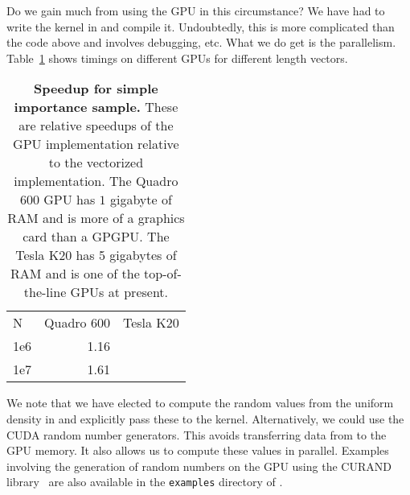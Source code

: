 Do we gain much from using the GPU in this circumstance?
We have had to write the kernel in \C{} and compile it.
Undoubtedly, this is more complicated than the \R{} code above
and involves debugging, etc.
What we do get is the parallelism. 
Table~\ref{tab:ImportanceSamplingTimings} shows timings
on different GPUs for different length vectors.
\begin{table}
\begin{tabular}{lrr}
 N  & Quadro 600 & Tesla K20 \\
1e6 &  1.16  &  \\
1e7 &  1.61  &  \\
\end{tabular}
\caption{\textbf{Speedup for simple importance sample.}
These are relative speedups of the GPU implementation relative
to the vectorized \R{} implementation.
The Quadro 600 GPU has $1$ gigabyte of RAM and is more of a
graphics card than a GPGPU.
The Tesla K20 has 5 gigabytes of RAM and is one of the top-of-the-line
GPUs at present.
}\label{tab:ImportanceSamplingTimings} 
\end{table}
\begin{comment}
ids = lapply(list.files(pattern = "rda$"), load, globalenv())
times = structure(lapply(unlist(ids), function(id) get(id)[3,]), names = unlist(ids))
tm = cbind(data.frame(times = sapply(times, median)), as.data.frame(do.call(rbind, strsplit(unlist(ids), "\\."))))
names(tm) = c('times', 'fun', 'N', 'GPU')
with(tm, tapply(tm, list(N, GPU), function(x) x[1, 'times']/x[2, 'times']))
\end{comment}



We note that we have elected to compute the random values from the
uniform density in \R{} and explicitly pass these to the kernel.
Alternatively, we could use the CUDA random number generators.
This avoids transferring data from \R{} to the GPU memory.
It also allows us to compute these values in parallel. Examples
involving the generation of random numbers on the GPU using
the CURAND library~\citep{bib:curand} are also 
available in the \texttt{examples} directory of . 

